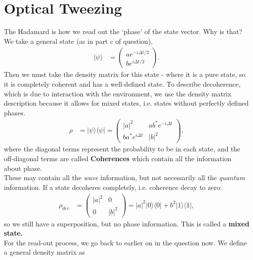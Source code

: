 \documentclass[a4paper, 11pt, normalem]{report}
\begin{document}
\chapter{Optical Tweezing}

\begin{example}
    The Hadamard is how we read out the `phase' of the state vector.
    Why is that?
    We take a general state (as in part c of question),
    \begin{align}
        |\psi\rangle &= \begin{pmatrix} ae^{-i\Delta t/2} \\ be^{i\Delta t/2} \end{pmatrix}.
    \end{align}
    Then we must take the density matrix for this state - where it is a pure state, so it is completely coherent and has a well-defined state.
    To describe decoherence, which is due to interaction with the environment, we use the density matrix description because it allows for mixed states, i.e. states without perfectly defined phases.
    \begin{align}
        \rho &= |\psi\rangle\langle\psi| = \begin{pmatrix} |a|^2 & ab^*e^{-i\Delta t} \\ ba^*e^{i\Delta t} & |b|^2 \end{pmatrix},
    \end{align}
    where the diagonal terms represent the probability to be in each state, and the off-diagonal terms are called \textbf{Coherences} which contain all the information about phase.\\
    These may contain all the \emph{wave} information, but not necessarily all the \emph{quantum} information.
    If a state decoheres completely, i.e. coherence decay to zero:
    \begin{align}
        \rho_{dec} &= \begin{pmatrix} |a|^2 & 0 \\ 0 & |b|^2\end{pmatrix} = |a|^2|0\rangle\langle0| + b^2|1\rangle\langle1|,
    \end{align}
    so we still have a superposition, but no phase information.
    This is called a \textbf{mixed state.}\\
    For the read-out process, we go back to earlier on in the question now.
    We define a general density matrix as
    \begin{align}

\end{align}
\end{example}
\end{document}
